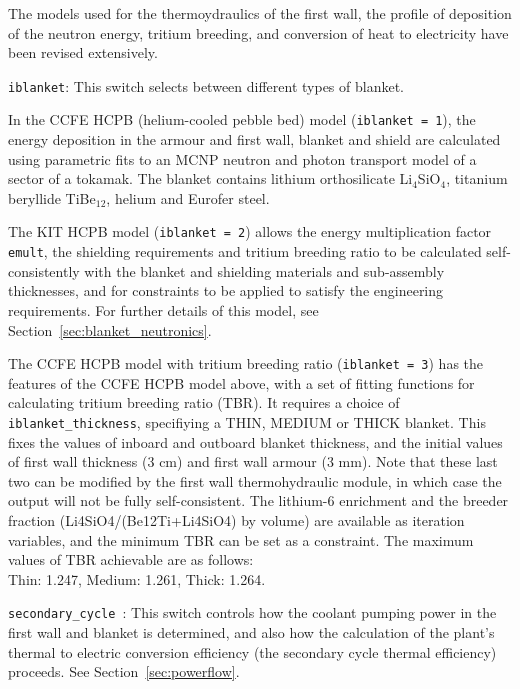 \documentclass[11pt,a4paper]{report}
\begin{document}
The models used for the thermoydraulics of the first wall, the profile of deposition of the neutron energy, tritium breeding, and conversion of heat to electricity have been revised extensively.
\begin{description}

\item{\texttt{iblanket}:} This switch selects between different types of blanket.

In the CCFE HCPB (helium-cooled pebble bed) model (\texttt{iblanket = 1}), the energy deposition in the armour and first wall, blanket and shield are calculated using parametric fits to an MCNP neutron and photon transport model of a sector of a tokamak.  The blanket contains lithium orthosilicate Li$_4$SiO$_4$, titanium beryllide TiBe$_{12}$, helium and Eurofer steel. 

The KIT HCPB model (\texttt{iblanket = 2}) allows the energy multiplication factor \texttt{emult}, the shielding requirements and tritium breeding ratio to be calculated self-consistently with the blanket and shielding materials and sub-assembly thicknesses, and for constraints to be applied to satisfy the engineering requirements. For further details of this model, see Section~\ref{sec:blanket_neutronics}.

The CCFE HCPB model with tritium breeding ratio (\texttt{iblanket = 3}) has the features of the CCFE HCPB model above, with a set of fitting functions for calculating tritium breeding ratio (TBR).  It requires a choice of \texttt{iblanket\_thickness}, specifiying a THIN, MEDIUM or THICK blanket.  This fixes the values of inboard and outboard blanket thickness, and the initial values of first wall thickness (3 cm) and first wall armour (3 mm).  Note that these last two can be modified by the first wall thermohydraulic module, in which case the output will not be fully self-consistent.  The lithium-6 enrichment and the breeder fraction (Li4SiO4/(Be12Ti+Li4SiO4) by volume) are available as iteration variables, and the minimum TBR can be set as a constraint.  The maximum values of TBR achievable are as follows:\\
Thin: 1.247, Medium: 1.261, Thick: 1.264.

\item{\texttt{secondary\_cycle }:} This switch controls how the coolant pumping power in the first wall and blanket is determined, and also how the calculation of the plant's thermal to electric conversion efficiency (the secondary cycle thermal efficiency) proceeds. See Section~\ref{sec:powerflow}.
 
\end{description}
\end{document}
